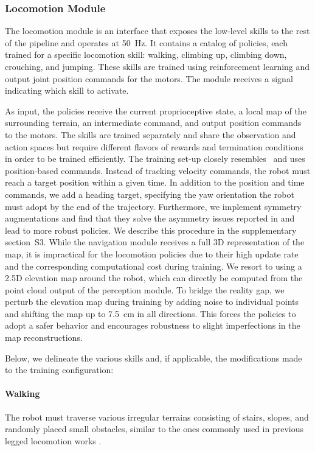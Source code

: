 \documentclass[conference]{IEEEtran}
\begin{document}
\subsubsection{Locomotion Module}
The locomotion module is an interface that exposes the low-level skills to the rest of the pipeline and operates at \SI{50}{Hz}.
It contains a catalog of policies, each trained for a specific locomotion skill: walking, climbing up, climbing down, crouching, and jumping.
These skills are trained using reinforcement learning and output joint position commands for the motors.
The module receives a signal indicating which skill to activate. 

As input, the policies receive the current proprioceptive state, a local map of the surrounding terrain, an intermediate command, and output position commands to the motors.
The skills are trained separately and share the observation and action spaces but require different flavors of rewards and termination conditions in order to be trained efficiently. The training set-up closely resembles~\cite{rudinAdvancedSkills} and uses position-based commands. Instead of tracking velocity commands, the robot must reach a target position within a given time. In addition to the position and time commands, we add a heading target, specifying the yaw orientation the robot must adopt by the end of the trajectory. Furthermore, we implement symmetry augmentations and find that they solve the asymmetry issues reported in \cite{rudinAdvancedSkills} and lead to more robust policies. We describe this procedure in the supplementary section~S3.
While the navigation module receives a full 3D representation of the map, it is impractical for the locomotion policies due to their high update rate and the corresponding computational cost during training. We resort to using a 2.5D elevation map around the robot, which can directly be computed from the point cloud output of the perception module. To bridge the reality gap, we perturb the elevation map during training by adding noise to individual points and shifting the map up to \SI{7.5}{\cm} in all directions. This forces the policies to adopt a safer behavior and encourages robustness to slight imperfections in the map reconstructions.

Below, we delineate the various skills and, if applicable, the modifications made to the training configuration:

\paragraph{Walking} The robot must traverse various irregular terrains consisting of stairs, slopes, and randomly placed small obstacles, similar to the ones commonly used in previous legged locomotion works \cite{miki2021locomotion, rudin2022minutes}. 
\end{document}
